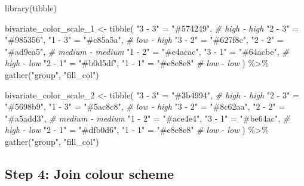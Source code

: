 \documentclass[
]{book}
\newenvironment{Shaded}{\begin{snugshade}}{\end{snugshade}}
\newcommand{\CommentTok}[1]{\textcolor[rgb]{0.56,0.35,0.01}{\textit{#1}}}
\newcommand{\FunctionTok}[1]{\textcolor[rgb]{0.00,0.00,0.00}{#1}}
\newcommand{\NormalTok}[1]{#1}
\newcommand{\OtherTok}[1]{\textcolor[rgb]{0.56,0.35,0.01}{#1}}
\newcommand{\SpecialCharTok}[1]{\textcolor[rgb]{0.00,0.00,0.00}{#1}}
\newcommand{\StringTok}[1]{\textcolor[rgb]{0.31,0.60,0.02}{#1}}
\begin{document}
\begin{Shaded}
\begin{Highlighting}[]
\FunctionTok{library}\NormalTok{(tibble)}

\NormalTok{bivariate\_color\_scale\_1 }\OtherTok{\textless{}{-}} \FunctionTok{tibble}\NormalTok{(}
  \StringTok{"3 {-} 3"} \OtherTok{=} \StringTok{"\#574249"}\NormalTok{, }\CommentTok{\# high {-} high }
  \StringTok{"2 {-} 3"} \OtherTok{=} \StringTok{"\#985356"}\NormalTok{,}
  \StringTok{"1 {-} 3"} \OtherTok{=} \StringTok{"\#c85a5a"}\NormalTok{, }\CommentTok{\# low {-} high }
  \StringTok{"3 {-} 2"} \OtherTok{=} \StringTok{"\#627f8c"}\NormalTok{,}
  \StringTok{"2 {-} 2"} \OtherTok{=} \StringTok{"\#ad9ea5"}\NormalTok{, }\CommentTok{\# medium {-} medium }
  \StringTok{"1 {-} 2"} \OtherTok{=} \StringTok{"\#e4acac"}\NormalTok{,}
  \StringTok{"3 {-} 1"} \OtherTok{=} \StringTok{"\#64acbe"}\NormalTok{, }\CommentTok{\# high {-} low }
  \StringTok{"2 {-} 1"} \OtherTok{=} \StringTok{"\#b0d5df"}\NormalTok{,}
  \StringTok{"1 {-} 1"} \OtherTok{=} \StringTok{"\#e8e8e8"} \CommentTok{\# low {-} low }
\NormalTok{) }\SpecialCharTok{\%\textgreater{}\%}
  \FunctionTok{gather}\NormalTok{(}\StringTok{"group"}\NormalTok{, }\StringTok{"fill\_col"}\NormalTok{)}

\NormalTok{bivariate\_color\_scale\_2 }\OtherTok{\textless{}{-}} \FunctionTok{tibble}\NormalTok{(}
  \StringTok{"3 {-} 3"} \OtherTok{=} \StringTok{"\#3b4994"}\NormalTok{, }\CommentTok{\# high {-} high }
  \StringTok{"2 {-} 3"} \OtherTok{=} \StringTok{"\#5698b9"}\NormalTok{,}
  \StringTok{"1 {-} 3"} \OtherTok{=} \StringTok{"\#5ac8c8"}\NormalTok{, }\CommentTok{\# low {-} high }
  \StringTok{"3 {-} 2"} \OtherTok{=} \StringTok{"\#8c62aa"}\NormalTok{,}
  \StringTok{"2 {-} 2"} \OtherTok{=} \StringTok{"\#a5add3"}\NormalTok{, }\CommentTok{\# medium {-} medium }
  \StringTok{"1 {-} 2"} \OtherTok{=} \StringTok{"\#ace4e4"}\NormalTok{,}
  \StringTok{"3 {-} 1"} \OtherTok{=} \StringTok{"\#be64ac"}\NormalTok{, }\CommentTok{\# high {-} low }
  \StringTok{"2 {-} 1"} \OtherTok{=} \StringTok{"\#dfb0d6"}\NormalTok{,}
  \StringTok{"1 {-} 1"} \OtherTok{=} \StringTok{"\#e8e8e8"} \CommentTok{\# low {-} low }
\NormalTok{) }\SpecialCharTok{\%\textgreater{}\%}
  \FunctionTok{gather}\NormalTok{(}\StringTok{"group"}\NormalTok{, }\StringTok{"fill\_col"}\NormalTok{)}
\end{Highlighting}
\end{Shaded}

\hypertarget{step-4-join-colour-scheme}{%
\subsection{Step 4: Join colour scheme}\label{step-4-join-colour-scheme}}
\end{document}
